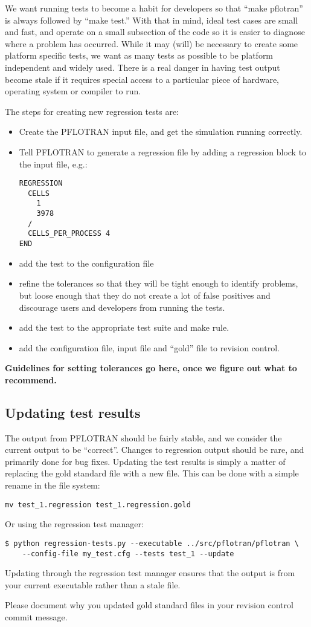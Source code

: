 We want running tests to become a habit for developers so that ``make
pflotran'' is always followed by ``make test.'' With that in mind, ideal
test cases are small and fast, and operate on a small subsection of
the code so it is easier to diagnose where a problem has
occurred. While it may (will) be necessary to create some platform
specific tests, we want as many tests as possible to be platform
independent and widely used. There is a real danger in having test
output become stale if it requires special access to a particular
piece of hardware, operating system or compiler to run.

The steps for creating new regression tests are:
\begin{itemize}
\item Create the PFLOTRAN input file, and get the simulation running
  correctly.

\item Tell PFLOTRAN to generate a regression file by adding a
  regression block to the input file, e.g.:
\begin{verbatim}
REGRESSION
  CELLS 
    1
    3978
  /
  CELLS_PER_PROCESS 4
END
\end{verbatim}

\item add the test to the configuration file

\item refine the tolerances so that they will be tight enough to
  identify problems, but loose enough that they do not create a lot of
  false positives and discourage users and developers from running the
  tests.

\item add the test to the appropriate test suite and make rule.

\item add the configuration file, input file and ``gold'' file to revision control.

\end{itemize}

\textbf{Guidelines for setting tolerances go here, once we figure out what to recommend.}

\subsection{Updating test results}
The output from PFLOTRAN should be fairly stable, and we consider the
current output to be ``correct''. Changes to regression output should
be rare, and primarily done for bug fixes. Updating the test results
is simply a matter of replacing the gold standard file with a new
file. This can be done with a simple rename in the file system:
\begin{verbatim}
mv test_1.regression test_1.regression.gold
\end{verbatim}
Or using the regression test manager:
\begin{verbatim}
$ python regression-tests.py --executable ../src/pflotran/pflotran \
    --config-file my_test.cfg --tests test_1 --update
\end{verbatim}
Updating through the regression test manager ensures that the output
is from your current executable rather than a stale file.

Please document why you updated gold standard files in
your revision control commit message.
